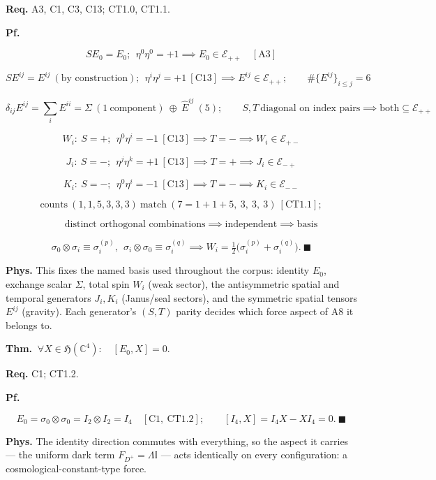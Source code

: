 \begin{theorem}
\textbf{Req.} A3, C1, C3, C13; CT1.0, CT1.1.

\textbf{Pf.}

\[
S E_0=E_0;\ \ \eta^0\eta^0=+1\implies E_0\in\mathcal E_{++}\quad[\mathrm{A3}]
\]

\[
S E^{ij}=E^{ij}\ (\text{by construction});\ \ \eta^i\eta^j=+1\ [\mathrm{C13}]\implies E^{ij}\in\mathcal E_{++};\qquad\#\{E^{ij}\}_{i\le j}=6
\]

\[
\delta_{ij}E^{ij}=\textstyle\sum_iE^{ii}=\Sigma\ (1\ \text{component})\ \oplus\ \hat E^{ij}\ (5);\qquad S,T\ \text{diagonal on index pairs}\implies\text{both}\subseteq\mathcal E_{++}
\]

\[
W_i:\ S=+;\ \ \eta^0\eta^i=-1\ [\mathrm{C13}]\implies T=-\implies W_i\in\mathcal E_{+-}
\]

\[
J_i:\ S=-;\ \ \eta^j\eta^k=+1\ [\mathrm{C13}]\implies T=+\implies J_i\in\mathcal E_{-+}
\]

\[
K_i:\ S=-;\ \ \eta^0\eta^i=-1\ [\mathrm{C13}]\implies T=-\implies K_i\in\mathcal E_{--}
\]

\[
\text{counts}\ (1,1,5,3,3,3)\ \text{match}\ (7{=}1{+}1{+}5,\ 3,\ 3,\ 3)\ [\mathrm{CT1.1}];
\]

\[
\qquad \text{distinct orthogonal combinations}\implies\text{independent}\implies\text{basis}
\]

\[
\sigma_0\otimes\sigma_i\equiv\sigma_i^{(p)},\ \ \sigma_i\otimes\sigma_0\equiv\sigma_i^{(q)}\implies W_i=\tfrac12\bigl(\sigma_i^{(p)}+\sigma_i^{(q)}\bigr).\ \blacksquare
\]

\textbf{Phys.} This fixes the named basis used throughout the corpus: identity $E_0$, exchange scalar $\Sigma$, total spin $W_i$ (weak sector), the antisymmetric spatial and temporal generators $J_i,K_i$ (Janus/seal sectors), and the symmetric spatial tensors $E^{ij}$ (gravity). Each generator’s $(S,T)$ parity decides which force aspect of A8 it belongs to.

\end{theorem}

\begin{theorem}\label{tag:CT1-3}
\textbf{Thm.} $\ \forall X\in\mathfrak H(\mathbb C^4):\quad[E_0,X]=0.$

\textbf{Req.} C1; CT1.2.

\textbf{Pf.}

\[
E_0=\sigma_0\otimes\sigma_0=I_2\otimes I_2=I_4\quad[\mathrm{C1},\ \mathrm{CT1.2}];\qquad
[I_4,X]=I_4X-XI_4=0.\ \blacksquare
\]

\textbf{Phys.} The identity direction commutes with everything, so the aspect it carries — the uniform dark term $F_{D^+}=\Lambda\mathbb I$ — acts identically on every configuration: a cosmological-constant-type force.

\end{theorem}

